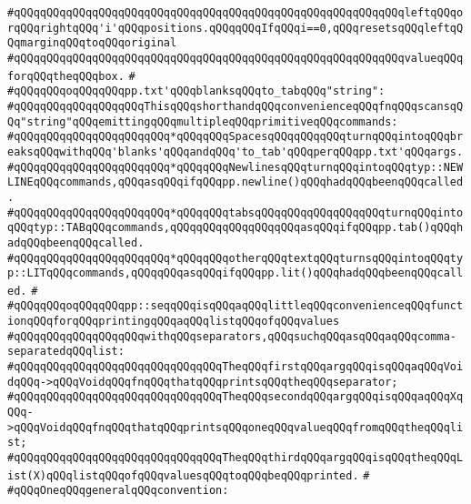 \verb|#qQQqqQQqqQQqqQQqqQQqqQQqqQQqqQQqqQQqqQQqqQQqqQQqqQQqqQQqqQQqleftqQQqorqQQqrightqQQq'i'qQQqpositions.qQQqqQQqIfqQQqi==0,qQQqresetsqQQqleftqQQqmarginqQQqtoqQQqoriginal|\newline
\verb|#qQQqqQQqqQQqqQQqqQQqqQQqqQQqqQQqqQQqqQQqqQQqqQQqqQQqqQQqqQQqvalueqQQqforqQQqtheqQQqbox.|\newline
\verb|#|\newline
\verb|#qQQqqQQqoqQQqqQQqpp.txt'qQQqblanksqQQqto_tabqQQq"string":|\newline
\verb|#qQQqqQQqqQQqqQQqqQQqThisqQQqshorthandqQQqconvenienceqQQqfnqQQqscansqQQq"string"qQQqemittingqQQqmultipleqQQqprimitiveqQQqcommands:|\newline
\verb|#qQQqqQQqqQQqqQQqqQQqqQQq*qQQqqQQqSpacesqQQqqQQqqQQqturnqQQqintoqQQqbreaksqQQqwithqQQq'blanks'qQQqandqQQq'to_tab'qQQqperqQQqpp.txt'qQQqargs.|\newline
\verb|#qQQqqQQqqQQqqQQqqQQqqQQq*qQQqqQQqNewlinesqQQqturnqQQqintoqQQqtyp::NEWLINEqQQqcommands,qQQqasqQQqifqQQqpp.newline()qQQqhadqQQqbeenqQQqcalled.|\newline
\verb|#qQQqqQQqqQQqqQQqqQQqqQQq*qQQqqQQqtabsqQQqqQQqqQQqqQQqqQQqturnqQQqintoqQQqtyp::TABqQQqcommands,qQQqqQQqqQQqqQQqqQQqasqQQqifqQQqpp.tab()qQQqhadqQQqbeenqQQqcalled.|\newline
\verb|#qQQqqQQqqQQqqQQqqQQqqQQq*qQQqqQQqotherqQQqtextqQQqturnsqQQqintoqQQqtyp::LITqQQqcommands,qQQqqQQqasqQQqifqQQqpp.lit()qQQqhadqQQqbeenqQQqcalled.|\newline
\verb|#|\newline
\verb|#qQQqqQQqoqQQqqQQqpp::seqqQQqisqQQqaqQQqlittleqQQqconvenienceqQQqfunctionqQQqforqQQqprintingqQQqaqQQqlistqQQqofqQQqvalues|\newline
\verb|#qQQqqQQqqQQqqQQqqQQqwithqQQqseparators,qQQqsuchqQQqasqQQqaqQQqcomma-separatedqQQqlist:|\newline
\verb|#qQQqqQQqqQQqqQQqqQQqqQQqqQQqqQQqTheqQQqfirstqQQqargqQQqisqQQqaqQQqVoidqQQq->qQQqVoidqQQqfnqQQqthatqQQqprintsqQQqtheqQQqseparator;|\newline
\verb|#qQQqqQQqqQQqqQQqqQQqqQQqqQQqqQQqTheqQQqsecondqQQqargqQQqisqQQqaqQQqXqQQq->qQQqVoidqQQqfnqQQqthatqQQqprintsqQQqoneqQQqvalueqQQqfromqQQqtheqQQqlist;|\newline
\verb|#qQQqqQQqqQQqqQQqqQQqqQQqqQQqqQQqTheqQQqthirdqQQqargqQQqisqQQqtheqQQqList(X)qQQqlistqQQqofqQQqvaluesqQQqtoqQQqbeqQQqprinted.|\newline
\verb|#|\newline
\verb|#qQQqOneqQQqgeneralqQQqconvention:|\newline
